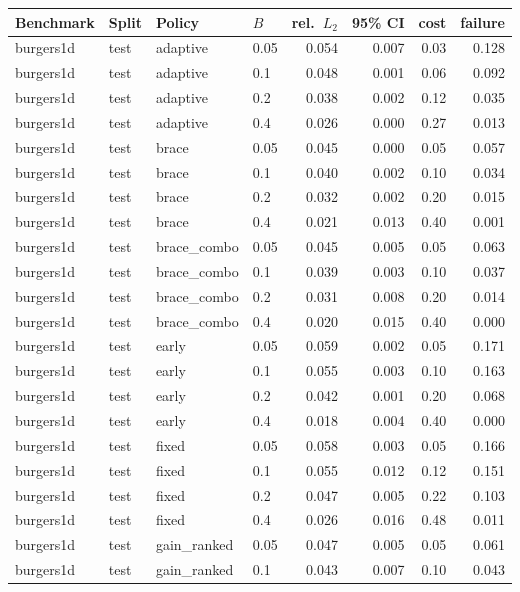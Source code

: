 \begin{longtable}{llllrrrr}
\toprule
Benchmark & Split & Policy & $B$ & rel.\ $L_2$ & 95\% CI & cost & failure \\
\midrule
\endhead
\bottomrule
\endlastfoot
burgers1d & test & adaptive & 0.05 & 0.054 & 0.007 & 0.03 & 0.128 \\
burgers1d & test & adaptive & 0.1 & 0.048 & 0.001 & 0.06 & 0.092 \\
burgers1d & test & adaptive & 0.2 & 0.038 & 0.002 & 0.12 & 0.035 \\
burgers1d & test & adaptive & 0.4 & 0.026 & 0.000 & 0.27 & 0.013 \\
burgers1d & test & brace & 0.05 & 0.045 & 0.000 & 0.05 & 0.057 \\
burgers1d & test & brace & 0.1 & 0.040 & 0.002 & 0.10 & 0.034 \\
burgers1d & test & brace & 0.2 & 0.032 & 0.002 & 0.20 & 0.015 \\
burgers1d & test & brace & 0.4 & 0.021 & 0.013 & 0.40 & 0.001 \\
burgers1d & test & brace\_combo & 0.05 & 0.045 & 0.005 & 0.05 & 0.063 \\
burgers1d & test & brace\_combo & 0.1 & 0.039 & 0.003 & 0.10 & 0.037 \\
burgers1d & test & brace\_combo & 0.2 & 0.031 & 0.008 & 0.20 & 0.014 \\
burgers1d & test & brace\_combo & 0.4 & 0.020 & 0.015 & 0.40 & 0.000 \\
burgers1d & test & early & 0.05 & 0.059 & 0.002 & 0.05 & 0.171 \\
burgers1d & test & early & 0.1 & 0.055 & 0.003 & 0.10 & 0.163 \\
burgers1d & test & early & 0.2 & 0.042 & 0.001 & 0.20 & 0.068 \\
burgers1d & test & early & 0.4 & 0.018 & 0.004 & 0.40 & 0.000 \\
burgers1d & test & fixed & 0.05 & 0.058 & 0.003 & 0.05 & 0.166 \\
burgers1d & test & fixed & 0.1 & 0.055 & 0.012 & 0.12 & 0.151 \\
burgers1d & test & fixed & 0.2 & 0.047 & 0.005 & 0.22 & 0.103 \\
burgers1d & test & fixed & 0.4 & 0.026 & 0.016 & 0.48 & 0.011 \\
burgers1d & test & gain\_ranked & 0.05 & 0.047 & 0.005 & 0.05 & 0.061 \\
burgers1d & test & gain\_ranked & 0.1 & 0.043 & 0.007 & 0.10 & 0.043 \\

\end{longtable}
